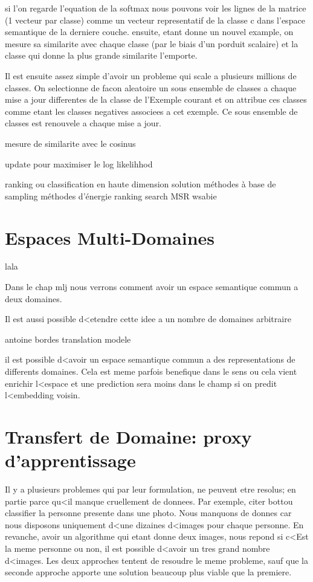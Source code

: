 si l'on regarde l'equation de la softmax
nous pouvons voir les lignes de la matrice (1 vecteur par classe) comme un vecteur representatif de la classe c dans l'espace semantique de la derniere couche.
ensuite, etant donne un nouvel example, on mesure sa similarite avec chaque classe (par le biais d'un porduit scalaire) et la classe qui donne la plus grande similarite l'emporte.

Il est ensuite assez simple d'avoir un probleme qui scale a plusieurs millions de classes. On selectionne de facon aleatoire un sous ensemble de classes a chaque mise a jour differentes de la classe de l'Exemple courant et on attribue ces classes comme etant les classes negatives associees a cet exemple. Ce sous ensemble de classes est renouvele a chaque mise a jour.

mesure de similarite avec le cosinus

update pour maximiser le log likelihhod

ranking ou classification en haute dimension
solution méthodes à base de sampling
méthodes d'énergie ranking
search MSR
wsabie

\section{Espaces Multi-Domaines}

lala

Dans le chap mlj nous verrons comment avoir un espace semantique commun a deux domaines. 

Il est aussi possible d<etendre cette idee a un nombre de domaines arbitraire

antoine bordes translation modele

il est possible d<avoir un espace semantique commun a des representations de differents domaines. Cela est meme parfois benefique dans le sens ou cela vient enrichir l<espace et une prediction sera moins dans le champ si on predit l<embedding voisin.

\section{Transfert de Domaine: proxy d'apprentissage}

Il y a plusieurs problemes qui par leur formulation, ne peuvent etre resolus; en partie parce qu<il manque cruellement de donnees. Par exemple, 
citer bottou
classifier la personne presente dans une photo. Nous manquons de donnes car nous disposons uniquement d<une dizaines d<images pour chaque personne. En revanche, avoir un algorithme qui etant donne deux images, nous repond si c<Est la meme personne ou non, il est possible d<avoir un tres grand nombre d<images. Les deux approches tentent de resoudre le meme probleme, sauf que la seconde approche apporte une solution beaucoup plus viable que la premiere.

